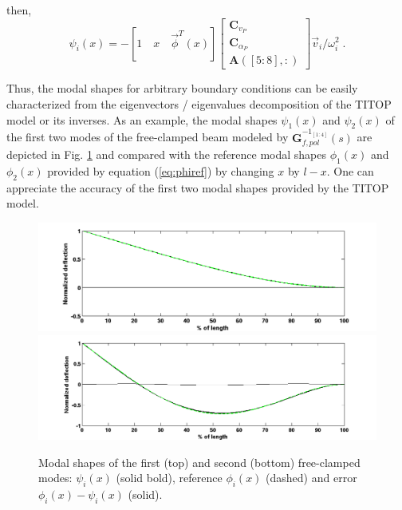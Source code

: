 \documentclass[smallcondensed]{svjour3}     %
\begin{document}
then, 
\begin{equation}\label{eq:psi}
\psi_i(x)=-[1\quad x \quad \vec{\phi}^T(x)]\left[\begin{array}{c}\mathbf{C}_{v_P}\\ \mathbf{C}_{\alpha_P} \\\mathbf{A}([5:8],:)\end{array}\right]\vec{v}_i/\omega_i^2\;.
\end{equation}

Thus, the modal shapes for arbitrary boundary conditions can be easily characterized from the eigenvectors / eigenvalues decomposition of the TITOP model or its inverses. As an example, the modal shapes $\psi_1(x)$ and $\psi_2(x)$ of the first two modes of the free-clamped beam modeled by $\mathbf{G}_{f,pol}^{-1_{[1:4]}}(s)$ are depicted in Fig. \ref{fig:fc1_2} and compared with the reference modal shapes $\phi_1(x)$ and $\phi_2(x)$ provided by equation (\ref{eq:phiref}) by changing $x$ by $l-x$. One can appreciate the accuracy of the first two modal shapes provided by the TITOP model.
\begin{figure}[htbp!]
  \includegraphics[width=\textwidth]{fc_mode1}\\
  \includegraphics[width=\textwidth]{fc_mode2}
\caption{Modal shapes of the first (top) and second (bottom) free-clamped modes: $\psi_i(x)$ (solid bold), reference $\phi_i(x)$ (dashed) and error $\phi_i(x)-\psi_i(x)$ (solid).}
\label{fig:fc1_2} 
\end{figure}
\end{document}
